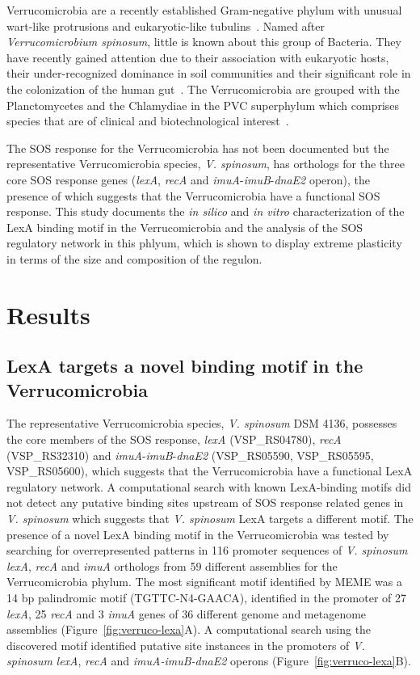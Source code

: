 Verrucomicrobia are a recently established Gram-negative phylum with unusual
wart-like protrusions and eukaryotic-like tubulins~\citep{garrity2001road,
  schlesner2006phylum}. Named after \textit{Verrucomicrobium spinosum}, little
is known about this group of Bacteria. They have recently gained attention due
to their association with eukaryotic hosts, their under-recognized dominance in
soil communities and their significant role in the colonization of the human
gut~\citep{sait2011genomic, bergmann2011under, dubourg2013high}. The
Verrucomicrobia are grouped with the Planctomycetes and the Chlamydiae in the
PVC superphylum which comprises species that are of clinical and
biotechnological interest~\citep{gupta2012molecular}.


The SOS response for the Verrucomicrobia has not been documented but the
representative Verrucomicrobia species, \textit{V. spinosum}, has orthologs for
the three core SOS response genes (\textit{lexA}, \textit{recA} and
\textit{imuA}-\textit{imuB}-\textit{dnaE2} operon), the presence of which
suggests that the Verrucomicrobia have a functional SOS response. This study
documents the \textit{in silico} and \textit{in vitro} characterization of the LexA
binding motif in the Verrucomicrobia and the analysis of the SOS regulatory
network in this phlyum, which is shown to display extreme plasticity in terms of
the size and composition of the regulon.

\section{Results}

\subsection{LexA targets a novel binding motif in the Verrucomicrobia}

The representative Verrucomicrobia species, \textit{V. spinosum} DSM 4136,
possesses the core members of the SOS response, \textit{lexA} (VSP\_RS04780),
\textit{recA} (VSP\_RS32310) and \textit{imuA}-\textit{imuB}-\textit{dnaE2}
(VSP\_RS05590, VSP\_RS05595, VSP\_RS05600), which suggests that the
Verrucomicrobia have a functional LexA regulatory network. A computational
search with known LexA-binding motifs did not detect any putative binding
sites upstream of SOS response related genes in \textit{V. spinosum} which
suggests that \textit{V. spinosum} LexA targets a different motif. The presence
of a novel LexA binding motif in
the Verrucomicrobia was tested by searching for overrepresented patterns in
116 promoter sequences of \textit{V. spinosum} \textit{lexA}, \textit{recA} and
\textit{imuA} orthologs from 59 different assemblies for the Verrucomicrobia
phylum. The most significant motif identified by MEME was a 14 bp palindromic
motif (TGTTC-N4-GAACA), identified in the promoter of 27 \textit{lexA}, 25
\textit{recA} and 3 \textit{imuA} genes of 36 different genome and metagenome
assemblies (Figure~\ref{fig:verruco-lexa}A). A computational search using the
discovered motif identified putative site instances in the promoters of
\textit{V. spinosum} \textit{lexA}, \textit{recA} and \textit{imuA-imuB-dnaE2}
operons (Figure~\ref{fig:verruco-lexa}B).


